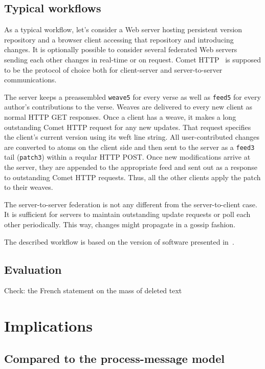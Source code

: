 \documentclass{acm_proc_article-sp}
\begin{document}
\subsection {Typical workflows}

As a typical workflow, let's consider a Web server hosting persistent version repository and a browser client accessing that repository and introducing changes. It is optionally possible to consider several federated Web servers sending each other changes in real-time or on request. Comet HTTP~\cite{comet} is supposed to be the protocol of choice both for client-server and server-to-server communications.

The server keeps a preassembled {\tt weave5} for every verse as well as {\tt feed5} for every author's contributions to the verse. Weaves are delivered to every new client as normal HTTP GET responses. Once a client has a weave, it makes a long outstanding Comet HTTP request for any new updates. That request specifies the client's current version using its weft line string. All user-contributed changes are converted to atoms on the client side and then sent to the server as a {\tt feed3} tail ({\tt patch3}) within a reqular HTTP POST. Once new modifications arrive at the server, they are appended to the appropriate feed and sent out as a response to outstanding Comet HTTP requests. Thus, all the other clients apply the patch to their weaves.

The server-to-server federation is not any different from the server-to-client case. It is sufficient for servers to maintain outstanding update requests or poll each other periodically. This way, changes might propagate in a gossip fashion.

The described workflow is based on the version of software presented in~\cite{broth-csr}.

\subsection{Evaluation}

Check: the French statement on the mass of deleted text

\section{Implications}  \label{sec:conc}

\subsection{Compared to the process-message model}
\end{document}
